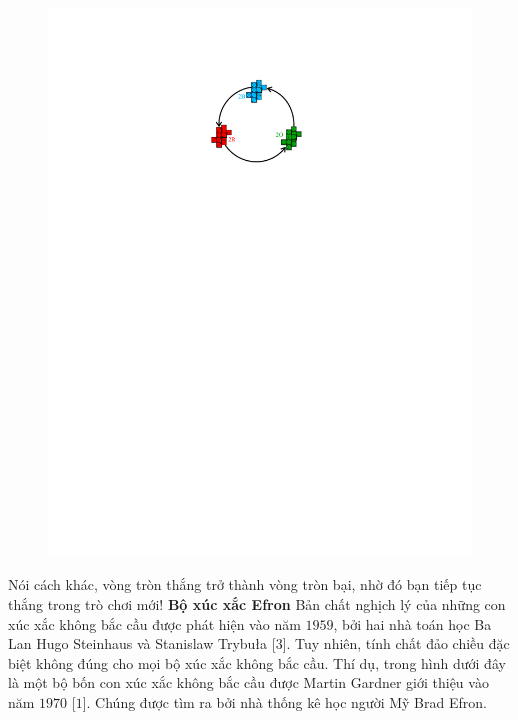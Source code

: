 \begin{multicols}{2}
\begin{figure}[H]
		\centering
		\captionsetup{labelformat= empty, justification=centering}
		\includegraphics[scale =0.7]{5}
		\vspace*{-15pt}
	\end{figure}
	Nói cách khác, vòng tròn thắng trở thành vòng tròn bại, nhờ đó bạn tiếp tục thắng trong trò chơi mới!
	\vskip 0.05cm
	\textbf{\color{quantoan}Bộ xúc xắc Efron}
	\vskip 0.05cm
	Bản chất nghịch lý của những con xúc xắc không bắc cầu được phát hiện vào năm $1959$, bởi hai nhà toán học Ba Lan Hugo Steinhaus và Stanislaw Trybuła [$3$].
	\vskip 0.05cm
	Tuy nhiên, tính chất đảo chiều đặc biệt không đúng cho mọi bộ xúc xắc không bắc cầu. Thí dụ, trong hình dưới đây là một bộ bốn con xúc xắc không bắc cầu được Martin Gardner giới thiệu vào năm $1970$ [$1$]. Chúng được tìm ra bởi nhà thống kê học người Mỹ Brad Efron.
	\begin{figure}[H]
		\vspace*{-5pt}
		\centering
		\captionsetup{labelformat= empty, justification=centering}

\end{figure}
\end{multicols}
